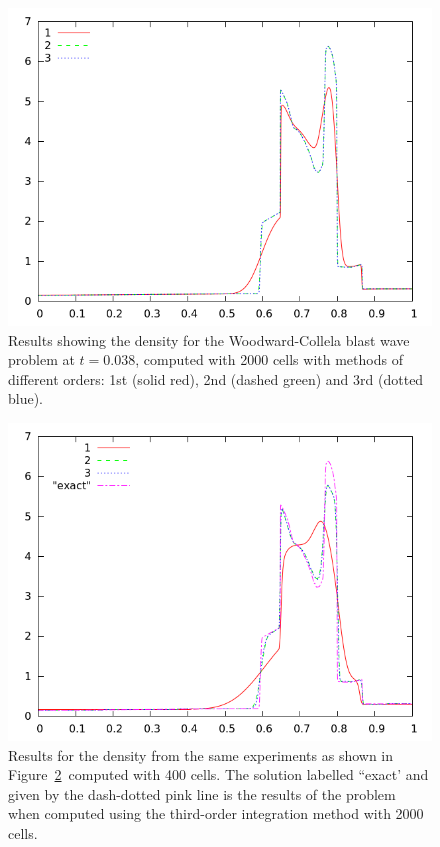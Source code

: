 \documentclass[10pt]{article}
\begin{document}
\begin{figure}[h]
  \begin{center}
     \includegraphics[width=.95\textwidth]{den_T12_2000.png}	
  \end{center}
  \caption{Results showing the density for the Woodward-Collela blast wave problem at $t=0.038$, computed with 2000 cells with methods of different orders: 1st (solid red), 2nd (dashed green) and 3rd (dotted blue).}
  \label{fig:den_T12_2000}
\end{figure}

\begin{figure}[h]
  \begin{center}
     \includegraphics[width=.95\textwidth]{den_T12_400.png}	
  \end{center}
  \caption{Results for the density from the same experiments as shown in Figure~\ref{fig:den_T12_400}~computed with 400 cells. The solution labelled ``exact' and given by the dash-dotted pink line is the results of the problem when computed using the third-order integration method with 2000 cells.}
  \label{fig:den_T12_400}
\end{figure}
\end{document}
